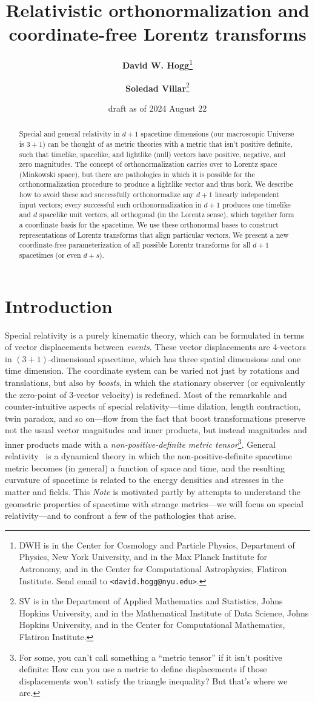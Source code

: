 \documentclass{article}
\title{\bfseries Relativistic orthonormalization and coordinate-free Lorentz transforms}
\author{\textbf{David W. Hogg}\footnote{DWH is in the Center for Cosmology and Particle Physics, Department of Physics, New York University, and in the Max Planck Institute for Astronomy, and in the Center for Computational Astrophysics, Flatiron Institute. Send email to \texttt{<david.hogg@nyu.edu>}.}
        \and
        \textbf{Soledad Villar}\footnote{SV is in the Department of Applied Mathematics and Statistics, Johns Hopkins University, and in the Mathematical Institute of Data Science, Johns Hopkins University, and in the Center for Computational Mathematics, Flatiron Institute.}}
\date{draft as of 2024 August 22}
\newcommand{\plus}{\!+\!} %
\newcommand{\documentname}{\textsl{Note}}
\begin{document}
\thispagestyle{plain}
\maketitle

\begin{abstract}\noindent %
    Special and general relativity in $d+1$ spacetime dimensions (our macroscopic Universe is $3+1$) can be thought of as metric theories with a metric that isn't positive definite, such that timelike, spacelike, and lightlike (null) vectors have positive, negative, and zero magnitudes.
    The concept of orthonormalization carries over to Lorentz space (Minkowski space), but there are pathologies in which it is possible for the orthonormalization procedure to produce a lightlike vector and thus bork.
    We describe how to avoid these and successfully orthonormalize any $d+1$ linearly independent input vectors; every successful such orthonormalization in $d+1$ produces one timelike and $d$ spacelike unit vectors, all orthogonal (in the Lorentz sense), which together form a coordinate basis for the spacetime.
    We use these orthonormal bases to construct representations of Lorentz transforms that align particular vectors.
    We present a new coordinate-free parameterization of all possible Lorentz transforms for all $d\plus1$ spacetimes (or even $d\plus s$).
\end{abstract}

\section{Introduction}\label{sec:intro}

Special relativity \cite{sr} is a purely kinematic theory, which can be formulated in terms of vector displacements between \emph{events}.
These vector displacements are 4-vectors in $(3\plus1)$-dimensional spacetime, which has three spatial dimensions and one time dimension.
The coordinate system can be varied not just by rotations and translations, but also by \emph{boosts}, in which the stationary observer (or equivalently the zero-point of 3-vector velocity) is redefined.
Most of the remarkable and counter-intuitive aspects of special relativity---time dilation, length contraction, twin paradox, and so on---flow from the fact that boost transformations preserve not the usual vector magnitudes and inner products, but instead magnitudes and inner products made with a \emph{non-positive-definite metric tensor}\footnote{For some, you can't call something a ``metric tensor'' if it isn't positive definite: How can you use a metric to define displacements if those displacements won't satisfy the triangle inequality? But that's where we are.}.
General relativity~\cite{gr} is a dynamical theory in which the non-positive-definite spacetime metric becomes (in general) a function of space and time, and the resulting curvature of spacetime is related to the energy densities and stresses in the matter and fields.
This \documentname{} is motivated partly by attempts to understand the geometric properties of spacetime with strange metrics---we will focus on special relativity---and to confront a few of the pathologies that arise.
\end{document}
